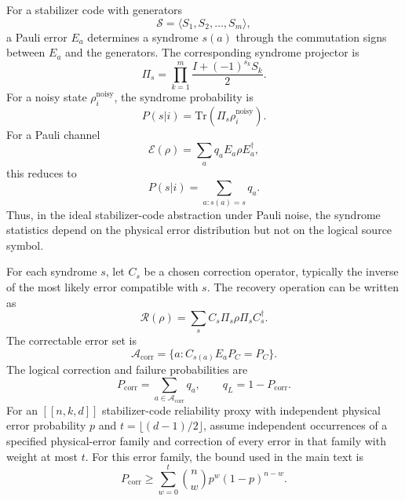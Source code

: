 For a stabilizer code with generators
\begin{equation}
    \mathcal{S}=\langle S_1,S_2,\ldots,S_m\rangle,
\end{equation}
a Pauli error $E_a$ determines a syndrome $s(a)$ through the commutation signs between $E_a$ and the generators. The corresponding syndrome projector is
\begin{equation}
    \Pi_s
    =
    \prod_{k=1}^{m}
    \frac{I+(-1)^{s_k}S_k}{2}.
\end{equation}
For a noisy state $\rho_i^{\mathrm{noisy}}$, the syndrome probability is
\begin{equation}
    P(s|i)
    =
    \mathrm{Tr}\left(\Pi_s\rho_i^{\mathrm{noisy}}\right).
\end{equation}
For a Pauli channel
\begin{equation}
    \mathcal{E}(\rho)=\sum_a q_aE_a\rho E_a^\dagger,
\end{equation}
this reduces to
\begin{equation}
    P(s|i)
    =
    \sum_{a:s(a)=s}q_a.
\end{equation}
Thus, in the ideal stabilizer-code abstraction under Pauli noise, the syndrome statistics depend on the physical error distribution but not on the logical source symbol.

For each syndrome $s$, let $C_s$ be a chosen correction operator, typically the inverse of the most likely error compatible with $s$. The recovery operation can be written as
\begin{equation}
    \mathcal{R}(\rho)
    =
    \sum_s
    C_s\Pi_s\rho\Pi_s C_s^\dagger .
\end{equation}
The correctable error set is
\begin{equation}
    \mathcal{A}_{\mathrm{corr}}
    =
    \{a:C_{s(a)}E_aP_C=P_C\}.
\end{equation}
The logical correction and failure probabilities are
\begin{equation}
    P_{\mathrm{corr}}
    =
    \sum_{a\in\mathcal{A}_{\mathrm{corr}}}q_a,
    \qquad
    q_L
    =
    1-P_{\mathrm{corr}}.
\end{equation}
For an $[[n,k,d]]$ stabilizer-code reliability proxy with independent physical error probability $p$ and $t=\lfloor(d-1)/2\rfloor$, assume independent occurrences of a specified physical-error family and correction of every error in that family with weight at most $t$. For this error family, the bound used in the main text is
\begin{equation}
    P_{\mathrm{corr}}
    \geq
    \sum_{w=0}^{t}
    \binom{n}{w}p^w(1-p)^{n-w}.
\end{equation}

